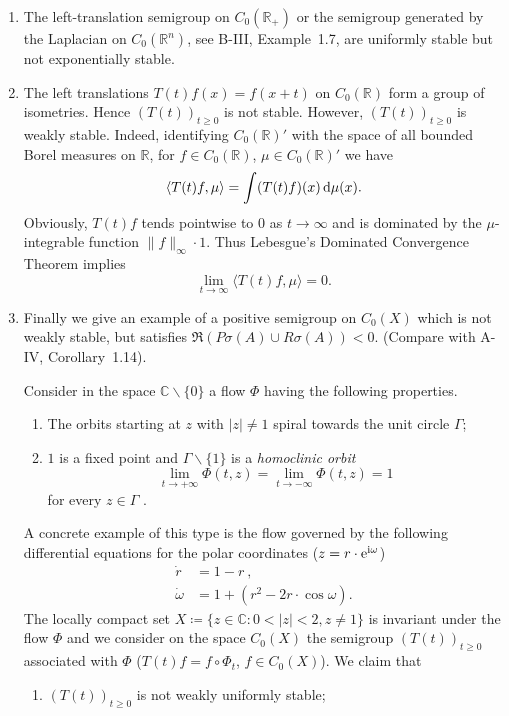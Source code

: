 \begin{example}\label{ex:b4-1.2}
%
\begin{enumerate}[\upshape (i), wide, labelindent=.5em]
\item
The left-translation semigroup on $C_{0}(\mathbb{R}_+)$ or the semigroup generated by the Laplacian on $C_{0}(\mathbb{R}^n)$, see B-III, Example~1.7, are uniformly stable but not exponentially stable.

\item 
The left translations $T(t)f(x) = f(x+t)$ on $C_{0}(\mathbb{R})$ form a group of isometries. 
Hence $(T(t))_{t \geq 0}$ is not stable. 
However, $(T(t))_{t \geq 0}$ is weakly stable. 
Indeed, identifying $C_{0}(\mathbb{R})'$ with the space of all bounded Borel measures on $\mathbb{R}$, for $f \in C_{0}(\mathbb{R})$, $\mu \in C_{0}(\mathbb{R})'$ we have
\[
   \langle T(t)f,\mu \rangle = \int (T(t)f)(x) \mathop{}\!\mathrm{d}{\mu}(x) .
\]
Obviously, $T(t)f$ tends pointwise to $0$ as $t \to \infty$ and is dominated by the $\mu$-integrable function $\|f\|_\infty \cdot 1$. 
Thus Lebesgue's Dominated Convergence Theorem implies
\[ 
\lim_{t\to\infty} \langle T(t)f,\mu \rangle = 0.
\]

\item 
Finally we give an example of a positive semigroup on $C_{0}(X)$ which is not weakly stable, but satisfies $\Re (P\sigma(A) \cup R\sigma(A)) < 0$. (Compare with A-IV, Corollary~1.14).

Consider in the space $\mathbb{C}\backslash\{0\}$ a flow $\Phi$ having the following properties.
\begin{enumerate}[--]
	\item 
	The orbits starting at $z$ with $|z| \neq 1$ spiral towards the unit circle $\Gamma$;
	
	\item 
	$1$ is a fixed point and $\Gamma\backslash\{1\}$ is a \emph{homoclinic orbit} \ie
    \[
    \lim_{t\to+\infty} \Phi(t,z) = \lim_{t\to-\infty} \Phi(t,z) = 1
    \]
    for every $z \in \Gamma$ .
\end{enumerate}

A concrete example of this type is the flow governed by the following differential equations for the polar coordinates (\ie $z = r\cdot \mathrm{e}^{\mathrm{i}\omega}$)
\begin{align*}
   \dot{r} &= 1 - r~,\\
   \dot{\omega} &= 1 + (r^2 - 2r\cdot\cos \omega) .
\end{align*}
The locally compact set $X \coloneq
 \{z \in \mathbb{C} \colon 0  <  |z|  <  2, z \neq 1\}$ is invariant under the flow $\Phi$ and we consider on the space $C_{0}(X)$ the semigroup $(T(t))_{t \geq 0}$ associated with $\Phi$ (\ie $T(t)f = f\circ\Phi_t$, $f \in C_{0}(X)$). 
 We claim that
\begin{enumerate}[\upshape (i)]
	\item
	$(T(t))_{t \geq 0}$ is not weakly uniformly stable;
	

\end{enumerate}
\end{enumerate}
\end{example}
